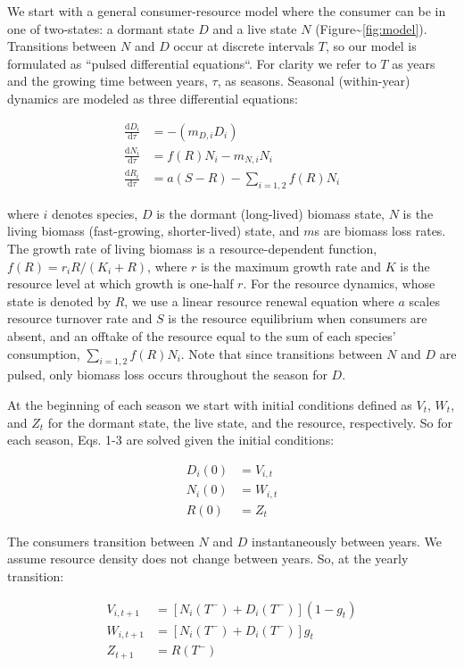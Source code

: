 \documentclass[12pt,]{article}
\begin{document}
We start with a general consumer-resource model where the consumer can
be in one of two-states: a dormant state $D$ and a live state $N$
(Figure\textasciitilde{}\ref{fig:model}). Transitions between $N$ and
$D$ occur at discrete intervals $T$, so our model is formulated as
``pulsed differential equations``. For clarity we refer to $T$ as years
and the growing time between years, $\tau$, as seasons. Seasonal
(within-year) dynamics are modeled as three differential equations:

\begin{align}
\frac{\text{d}D_{i}}{\text{d}\tau} &= -(m_{D,i}D_{i})\\
\frac{\text{d}N_{i}}{\text{d}\tau} &= f(R)N_{i} - m_{N,i}N_{i}\\
\frac{\text{d}R_{i}}{\text{d}\tau} &= a(S - R) - \sum\limits_{i=1,2}f(R)N_{i}
\end{align}

where $i$ denotes species, $D$ is the dormant (long-lived) biomass
state, $N$ is the living biomass (fast-growing, shorter-lived) state,
and $m$s are biomass loss rates. The growth rate of living biomass is a
resource-dependent function, $f(R) = r_{i}R/(K_{i}+R)$, where $r$ is the
maximum growth rate and $K$ is the resource level at which growth is
one-half $r$. For the resource dynamics, whose state is denoted by $R$,
we use a linear resource renewal equation where $a$ scales resource
turnover rate and $S$ is the resource equilibrium when consumers are
absent, and an offtake of the resource equal to the sum of each species'
consumption, $\sum_{i=1,2}f(R)N_{i}$. Note that since transitions
between $N$ and $D$ are pulsed, only biomass loss occurs throughout the
season for $D$.

At the beginning of each season we start with initial conditions defined
as $V_{t}$, $W_{t}$, and $Z_{t}$ for the dormant state, the live state,
and the resource, respectively. So for each season, Eqs. 1-3 are solved
given the initial conditions:

\begin{align}
  D_{i}(0) &= V_{i,t} \\
  N_{i}(0) &= W_{i,t} \\
  R(0) &= Z_{t}
\end{align}

The consumers transition between $N$ and $D$ instantaneously between
years. We assume resource density does not change between years. So, at
the yearly transition:

\begin{align}
  V_{i,t+1} &= [N_{i}(T^-)+D_{i}(T^-)](1-g_{t}) \\
  W_{i,t+1} &= [N_{i}(T^-)+D_{i}(T^-)]g_{t} \\
  Z_{t+1} &= R(T^-)
\end{align}
\end{document}
